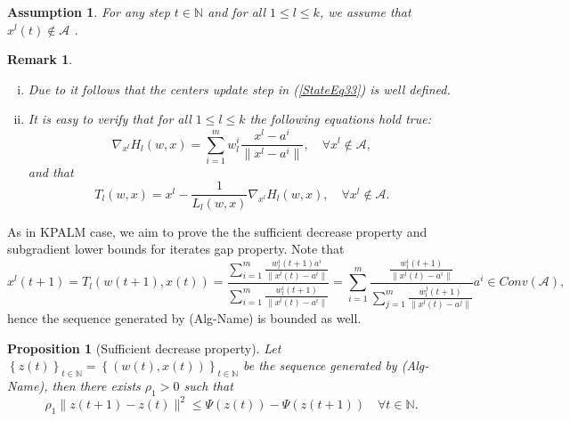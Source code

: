 \documentclass[11pt]{article}
\numberwithin{equation}{section}
\newtheorem{proposition}{Proposition}[section]
\newtheorem{remark}{Remark}
\newtheorem{assumption}{Assumption}
\begin{document}
\begin{assumption} \label{StateEq34}
For any step $t \in \mathbb{N}$ and for all $1 \leq l \leq k$, we assume that $x^l(t) \notin \mathcal{A}$ .
\end{assumption}

\begin{remark} 
	\begin{enumerate}[(i)]
	\item Due to  it follows that the centers update step in (\ref{StateEq33}) is well defined.
	\item It is easy to verify that for all $1 \leq l \leq k$ the following equations hold true:
	\begin{equation}
		\nabla_{x^l} H_l(w,x) = \sum\limits_{i=1}^{m} w^i_l \frac{x^l - a^i}{\|x^l - a^i\|} , \quad \forall x^l \notin \mathcal{A}, \label{StateEq35}
	\end{equation}
	and that 
	\begin{equation}
		T_l(w,x) = x^l - \frac{1}{L_l(w,x)}\nabla_{x^l} H_l(w,x), \quad \forall x^l \notin \mathcal{A} . \label{StateEq36}
	\end{equation}
	\end{enumerate}
\end{remark}

As in KPALM case, we aim to prove the the sufficient decrease property and subgradient lower bounds for iterates gap property. Note that
\begin{equation*}
x^l(t+1) = T_l(w(t+1),x(t)) 
= \frac{\sum\limits_{i=1}^{m}\frac{w^i_l(t+1)a^i}{\|x^l(t) - a^i\|}}{\sum\limits_{i=1}^{m}\frac{w^i_l(t+1)}{\|x^l(t) - a^i\|}} 
= \sum\limits_{i=1}^{m}\frac{\frac{w^i_l(t+1)}{\|x^l(t) - a^i\|}}{\sum\limits_{j=1}^{m}\frac{w^j_l(t+1)}{\|x^l(t) - a^j\|}} a^i \in Conv(\mathcal{A}) ,
\end{equation*}
hence the sequence generated by (Alg-Name) is bounded as well.

\begin{proposition}[Sufficient decrease property]
Let $\left\lbrace z(t) \right\rbrace_{t \in \mathbb{N}} = \left\lbrace \left( w(t) , x(t) \right) \right\rbrace_{t \in \mathbb{N}}$ be the sequence generated by (Alg-Name), then there exists $\rho_1 > 0$ such that 
\begin{equation*}
	\rho_1 \|z(t+1) - z(t)\|^2 \leq \Psi(z(t)) - \Psi(z(t+1)) \quad \forall t \in \mathbb{N} .
\end{equation*}
\end{proposition}
\end{document}
